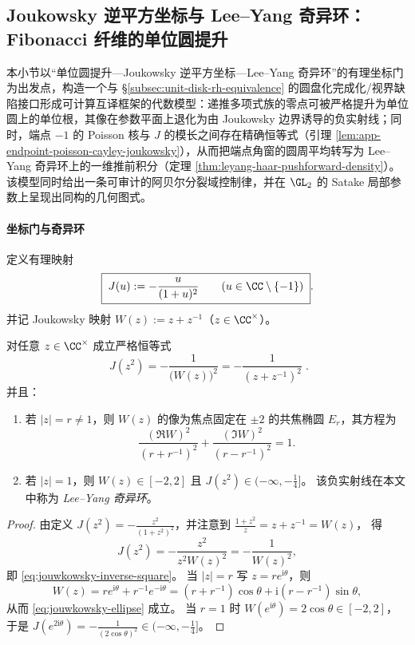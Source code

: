 \subsection{Joukowsky 逆平方坐标与 Lee--Yang 奇异环：Fibonacci 纤维的单位圆提升}\label{subsec:lee-yang-joukowsky-singular-ring}
本小节以“单位圆提升—Joukowsky 逆平方坐标—Lee--Yang 奇异环”的有理坐标门为出发点，构造一个与 \S\ref{subsec:unit-disk-rh-equivalence} 的圆盘化完成化/视界缺陷接口形成可计算互译框架的代数模型：递推多项式族的零点可被严格提升为单位圆上的单位根，其像在参数平面上退化为由 Joukowsky 边界诱导的负实射线；同时，端点 \(-1\) 的 Poisson 核与 \(J\) 的模长之间存在精确恒等式（引理 \ref{lem:app-endpoint-poisson-cayley-joukowsky}），从而把端点角窗的圆周平均转写为 Lee--Yang 奇异环上的一维推前积分（定理 \ref{thm:leyang-haar-pushforward-density}）。
该模型同时给出一条可审计的阿贝尔分裂域控制律，并在 \(\GL_2\) 的 Satake 局部参数上呈现出同构的几何图式。

\paragraph{坐标门与奇异环}
定义有理映射
\begin{equation}\label{eq:lee-yang-J-def}
\boxed{\;
J(u):=-\frac{u}{(1+u)^2}\qquad(u\in\CC\setminus\{-1\})\; }.
\end{equation}
并记 Joukowsky 映射 \(W(z):=z+z^{-1}\)（\(z\in\CC^{\times}\)）。



\begin{proposition}\label{prop:jouwkowsky-inverse-square}
对任意 \(z\in\CC^{\times}\) 成立严格恒等式
\begin{equation}\label{eq:jouwkowsky-inverse-square}
\boxed{\;
J(z^{2})=-\frac{1}{\bigl(W(z)\bigr)^{2}}=-\frac{1}{(z+z^{-1})^{2}}\; }.
\end{equation}
并且：
\begin{enumerate}
  \item 若 \(|z|=r\neq 1\)，则 \(W(z)\) 的像为焦点固定在 \(\pm 2\) 的共焦椭圆 \(E_r\)，其方程为
  \begin{equation}\label{eq:jouwkowsky-ellipse}
  \frac{(\Re W)^2}{(r+r^{-1})^2}+\frac{(\Im W)^2}{(r-r^{-1})^2}=1.
  \end{equation}
  \item 若 \(|z|=1\)，则 \(W(z)\in[-2,2]\) 且 \(J(z^2)\in(-\infty,-\tfrac14]\)。
  该负实射线在本文中称为 \emph{Lee--Yang 奇异环}。
\end{enumerate}
\end{proposition}
\begin{proof}
由定义 \(J(z^2)=-\frac{z^2}{(1+z^2)^2}\)，并注意到
\(
\frac{1+z^2}{z}=z+z^{-1}=W(z)
\)，
得
\[
J(z^2)=-\frac{z^2}{z^2 W(z)^2}=-\frac{1}{W(z)^2},
\]
即 \eqref{eq:jouwkowsky-inverse-square}。
当 \(|z|=r\) 写 \(z=re^{\mathrm{i}\theta}\)，则
\[
W(z)=re^{\mathrm{i}\theta}+r^{-1}e^{-\mathrm{i}\theta}
=(r+r^{-1})\cos\theta+\mathrm{i}(r-r^{-1})\sin\theta,
\]
从而 \eqref{eq:jouwkowsky-ellipse} 成立。
当 \(r=1\) 时 \(W(e^{\mathrm{i}\theta})=2\cos\theta\in[-2,2]\)，于是
\(
J(e^{2\mathrm{i}\theta})=-\frac{1}{(2\cos\theta)^2}\in(-\infty,-\tfrac14]
\)。
\end{proof}

